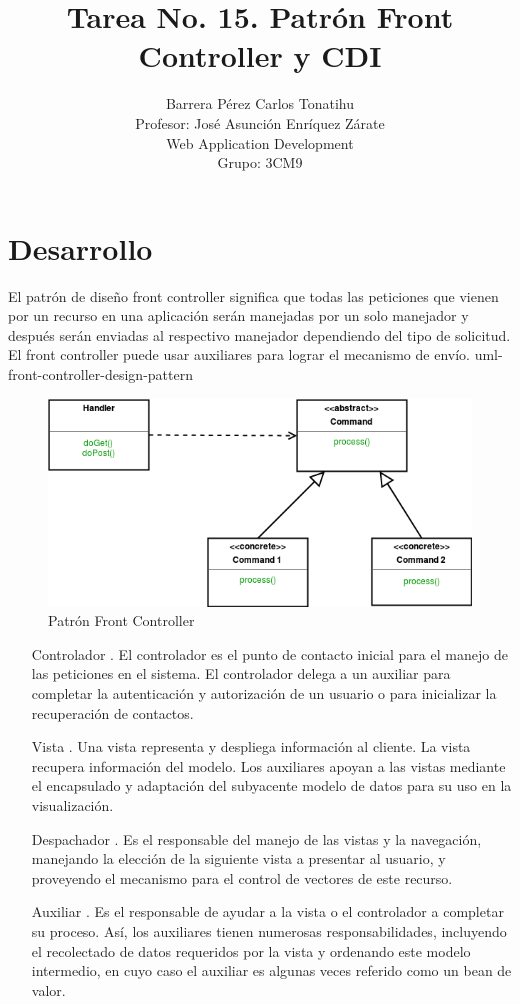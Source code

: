 \documentclass[a4paper,12pt]{article}
\title{Tarea No. 15. Patrón Front Controller y CDI}
\author{Barrera Pérez Carlos Tonatihu \\ Profesor: José Asunción Enríquez 
Zárate \\ Web Application Development \\ Grupo: 3CM9 }
\begin{document}
\maketitle
\newpage

\section{Desarrollo}
El patrón de diseño front controller significa que todas las peticiones que 
vienen por un recurso en una aplicación serán manejadas por un solo manejador y 
después serán enviadas al respectivo manejador dependiendo del tipo de 
solicitud. El front controller puede usar auxiliares para lograr el mecanismo 
de envío.
uml-front-controller-design-pattern

\begin{figure}[H]
    \begin{center}
    \includegraphics[width=\textwidth]{uml-front-controller-design-pattern.png}
    \caption{Patrón Front Controller}
    \label{fig:diagrama}
    \end{center}
\end{figure}


\begin{itemize}
 \item [Controlador]. El controlador es el punto de contacto inicial para el 
manejo de las peticiones en el sistema. El controlador delega a un auxiliar 
para completar la autenticación y autorización de un usuario o para inicializar 
la recuperación de contactos.
\item [Vista]. Una vista representa y despliega información al cliente. La 
vista recupera información del modelo. Los auxiliares apoyan a las vistas 
mediante el encapsulado y adaptación del subyacente modelo de datos para su uso 
en la visualización.
\item [Despachador]. Es el responsable del manejo de las vistas y la 
navegación, manejando la elección de la siguiente vista a presentar al usuario, 
y proveyendo el mecanismo para el control de vectores de este recurso.
\item [Auxiliar]. Es el responsable de ayudar a la vista o el controlador a 
completar su proceso. Así, los auxiliares tienen numerosas responsabilidades, 
incluyendo el recolectado de datos requeridos por la vista y ordenando este 
modelo intermedio, en cuyo caso el auxiliar es algunas veces referido como un 
bean de valor. 
\end{itemize}
\end{document}
